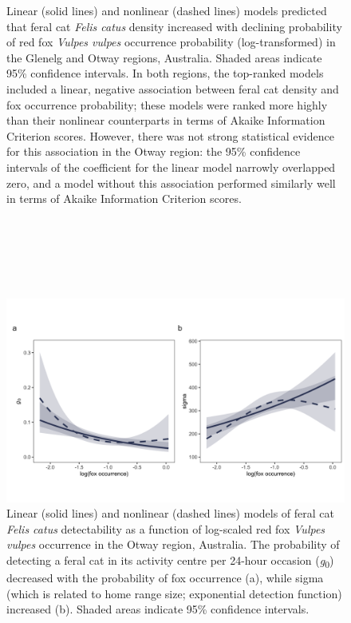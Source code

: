 \documentclass[11pt,a4paper,titlepage,twoside,openright]{style/unimelbthesis}
\begin{document}
\begin{mainmatter}
\begin{figure}
{}

\caption{Linear (solid lines) and nonlinear (dashed lines) models predicted that feral cat \textit{Felis catus} density increased with declining probability of red fox \textit{Vulpes vulpes} occurrence probability (log-transformed) in the Glenelg and Otway regions, Australia. Shaded areas indicate 95\% confidence intervals. In both regions, the top-ranked models included a linear, negative association between feral cat density and fox occurrence probability; these models were ranked more highly than their nonlinear counterparts in terms of Akaike Information Criterion scores. However, there was not strong statistical evidence for this association in the Otway region: the 95\% confidence intervals of the coefficient for the linear model narrowly overlapped zero, and a model without this association performed similarly well in terms of Akaike Information Criterion scores.}\label{fig:dcor}
\end{figure}
\newpage

\(~\)

\(~\)

\(~\)
\begin{figure}

{\centering \includegraphics[width=1\linewidth]{figure/foxDet_otways_600dpi} 

}

\caption{Linear (solid lines) and nonlinear (dashed lines) models of feral cat \textit{Felis catus} detectability as a function of log-scaled red fox \textit{Vulpes vulpes} occurrence in the Otway region, Australia. The probability of detecting a feral cat in its activity centre per 24-hour occasion (\textit{g}\textsubscript{0}) decreased with the probability of fox occurrence (a), while sigma (which is related to home range size; exponential detection function) increased (b). Shaded areas indicate 95\% confidence intervals.}\label{fig:detcor}
\end{figure}
\newpage


\end{mainmatter}
\end{document}
